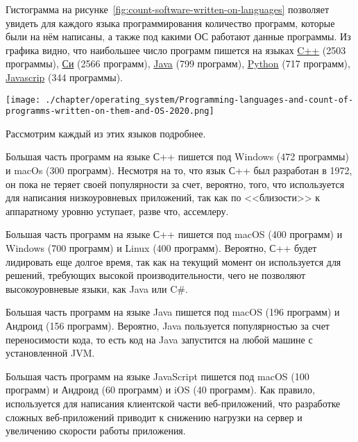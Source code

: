 Гистограмма на рисунке~\ref{fig:count-software-written-on-languages} позволяет увидеть для каждого языка программирования количество программ, которые были на нём написаны, а также под какими ОС работают данные программы. Из графика видно, что наибольшее число программ пишется на языках \href{https://www.wikidata.org/wiki/Q2407}{C++} (2503 программы), \href{https://www.wikidata.org/wiki/Q15777}{Си} (2566 программ), \href{https://www.wikidata.org/wiki/Q251}{Java} (799 программ), \href{https://www.wikidata.org/wiki/Q28865}{Python} (717 программ),  \href{https://www.wikidata.org/wiki/Q2005}{Javascrip} (344 программы).


\begin{figure*}[h!]
	\texttt{[image: ./chapter/operating\_system/Programming-languages-and-count-of-programms-written-on-them-and-OS-2020.png]}
	\caption{Языки программирования и количества ОС, под которыми работают программы, написанные на них 2020 год.}
	\label{fig:count-software-written-on-languages}
\end{figure*}

Рассмотрим каждый из этих языков подробнее.

Большая часть программ на языке С++ пишется под Windows (472 программы) и macOs (300 программ). Несмотря на то, что язык С++ был разработан в 1972, он пока не теряет своей популярности за счет, вероятно, того, что используется для написания низкоуровневых приложений, так как по <<близости>> к аппаратному уровню уступает, разве что, ассемлеру.

Большая часть программ на языке С++ пишется под macOS (400 программ) и Windows (700 программ) и Linux (400 программ). Вероятно, С++ будет лидировать еще долгое время, так как на текущий момент он используется для решений, требующих высокой производительности, чего не позволяют высокоуровневые языки, как Java или C\#.

Большая часть программ на языке Java пишется под macOS (196 программ) и Андроид (156 программ). Вероятно, Java пользуется популярностью за счет переносимости\footnotemark {}
кода, то есть код на Java запустится на любой машине с установленной JVM\footnotemark.

Большая часть программ на языке JavaScript пишется под macOS (100 программ) и Андроид (60 программ) и iOS (40 программ). Как правило, используется для написания клиентской части веб-приложений, что разработке сложных веб-приложений приводит к снижению нагрузки на сервер и увеличению скорости работы приложения.

